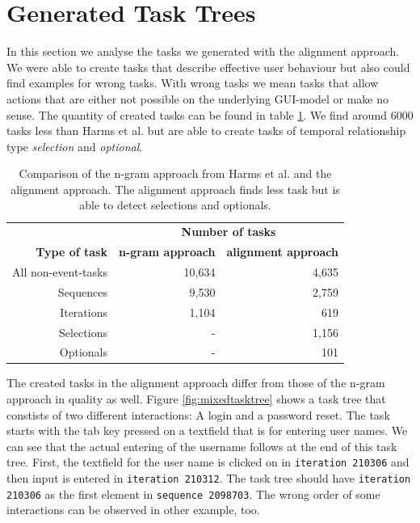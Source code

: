 \clearpage
\section{Generated Task Trees}
In this section we analyse the tasks we generated with the alignment approach. 
We were able to create tasks that describe effective user behaviour but also could find examples for wrong tasks.
With wrong tasks we mean tasks that allow actions that are either not possible on the underlying GUI-model or make no sense.
The quantity of created tasks can be found in table \ref{tab:taskquantity}. 
We find around 6000 tasks less than Harms et al. but are able to create tasks of temporal relationship type \textit{selection} and \textit{optional}.

\begin{table}
	\centering
	\begin{tabular}{ r r r }
	   \toprule
	    & \multicolumn{2}{c}{\textbf{Number of tasks}} \\
		\cmidrule{2-3}
		\textbf{Type of task}& \textbf{n-gram approach} & \textbf{alignment approach} \\
	   \midrule
	   All non-event-tasks 	& 10,634 			& 4,635 \\
		\midrule
	   Sequences 				& 9,530 				& 2,759 \\
	   Iterations 				& 1,104 				& 619 \\
	   Selections 				& -\hspace{12pt}	& 1,156 \\
	   Optionals 				& -\hspace{12pt} 	& 101 \\
	   \bottomrule
\end{tabular}
\caption{Comparison of the n-gram approach from Harms et al. and the alignment approach. The alignment approach finds less task but is able to detect selections and optionals.}
\label{tab:taskquantity}
\end{table}

The created tasks in the alignment approach differ from those of the n-gram approach in quality as well. 
Figure \ref{fig:mixedtasktree} shows a task tree that constists of two different interactions: A login and a password reset.
The task starts with the tab key pressed on a textfield that is for entering user names. 
We can see that the actual entering of the username follows at the end of this task tree. 
First, the textfield for the user name is clicked on in \texttt{iteration 210306} and then input is entered in \texttt{iteration 210312}. 
The task tree should have \texttt{iteration 210306} as the first element in \texttt{sequence 2098703}.
The wrong order of some interactions can be observed in other example, too.  

